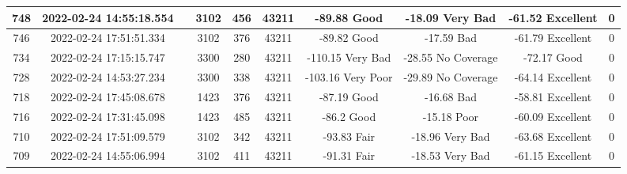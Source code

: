\begin{longtable*}{|c|c|c|c|c|c|c|c|c|c|}
748&2022-02-24 14:55:18.554&&3102&456&43211& -89.88    Good        & -18.09    Very Bad    & -61.52    Excellent   & 0\\\hline
{}746&2022-02-24 17:51:51.334&&3102&376&43211& -89.82    Good        & -17.59    Bad         & -61.79    Excellent   & 0\\\hline
{}734&2022-02-24 17:15:15.747&&3300&280&43211& -110.15   Very Bad    & -28.55    No Coverage & -72.17    Good        & 0\\\hline
{}728&2022-02-24 14:53:27.234&&3300&338&43211& -103.16   Very Poor   & -29.89    No Coverage & -64.14    Excellent   & 0\\\hline
{}718&2022-02-24 17:45:08.678&&1423&376&43211& -87.19    Good        & -16.68    Bad         & -58.81    Excellent   & 0\\\hline
{}716&2022-02-24 17:31:45.098&&1423&485&43211& -86.2     Good        & -15.18    Poor        & -60.09    Excellent   & 0\\\hline
{}710&2022-02-24 17:51:09.579&&3102&342&43211& -93.83    Fair        & -18.96    Very Bad    & -63.68    Excellent   & 0\\\hline
{}709&2022-02-24 14:55:06.994&&3102&411&43211& -91.31    Fair        & -18.53    Very Bad    & -61.15    Excellent   & 0\\\hline

\end{longtable*}
